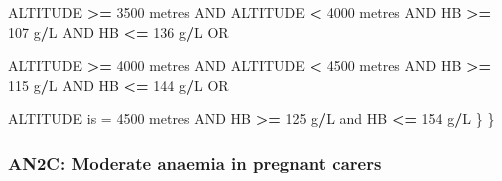 \documentclass[12pt,a4paper]{article}
\newenvironment{Shaded}{\begin{snugshade}}{\end{snugshade}}
\newcommand{\DecValTok}[1]{\textcolor[rgb]{0.00,0.00,0.81}{#1}}
\newcommand{\NormalTok}[1]{#1}
\newcommand{\OperatorTok}[1]{\textcolor[rgb]{0.81,0.36,0.00}{\textbf{#1}}}
\newcommand{\StringTok}[1]{\textcolor[rgb]{0.31,0.60,0.02}{#1}}
\begin{document}
\begin{Shaded}
\begin{Highlighting}[]
\NormalTok{        ALTITUDE }\OperatorTok{>=}\StringTok{ }\DecValTok{3500}\NormalTok{ metres AND ALTITUDE }\OperatorTok{<}\StringTok{ }\DecValTok{4000}\NormalTok{ metres AND }
\NormalTok{          HB }\OperatorTok{>=}\StringTok{ }\DecValTok{107}\NormalTok{ g}\OperatorTok{/}\NormalTok{L AND HB }\OperatorTok{<=}\StringTok{ }\DecValTok{136}\NormalTok{ g}\OperatorTok{/}\NormalTok{L OR}

\NormalTok{        ALTITUDE }\OperatorTok{>=}\StringTok{ }\DecValTok{4000}\NormalTok{ metres AND ALTITUDE }\OperatorTok{<}\StringTok{ }\DecValTok{4500}\NormalTok{ metres AND }
\NormalTok{          HB }\OperatorTok{>=}\StringTok{ }\DecValTok{115}\NormalTok{ g}\OperatorTok{/}\NormalTok{L AND HB }\OperatorTok{<=}\StringTok{ }\DecValTok{144}\NormalTok{ g}\OperatorTok{/}\NormalTok{L OR}

\NormalTok{        ALTITUDE is =}\StringTok{ }\DecValTok{4500}\NormalTok{ metres AND HB }\OperatorTok{>=}\StringTok{ }\DecValTok{125}\NormalTok{ g}\OperatorTok{/}\NormalTok{L and HB }\OperatorTok{<=}\StringTok{ }\DecValTok{154}\NormalTok{ g}\OperatorTok{/}\NormalTok{L}
\NormalTok{      \}}
\NormalTok{  \}}
\end{Highlighting}
\end{Shaded}

\newpage

\hypertarget{an2c-moderate-anaemia-in-pregnant-carers}{%
\subsubsection{AN2C: Moderate anaemia in pregnant carers}\label{an2c-moderate-anaemia-in-pregnant-carers}}
\end{document}
